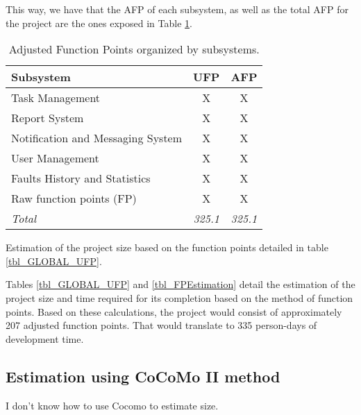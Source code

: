 This way, we have that the AFP of each subsystem, as well as the total AFP for the project are the ones exposed in Table \ref{tbl_GLOBAL_AFP}.

\begin{table}[hbtp]
\centering
\begin{tabular}{l|c|c}
\textbf{Subsystem} & \textbf{UFP} & \textbf{AFP} \\ \hline
Task Management  & X & X \\
Report System & X & X \\
Notification and Messaging System & X & X \\
User Management & X & X \\
Faults History and Statistics & X & X \\
Raw function points (FP) & X & X \\ \hline
\textit{Total} & \textit{325.1} & \textit{325.1}
\end{tabular}
\caption{Adjusted Function Points organized by subsystems.}
\label{tbl_GLOBAL_AFP}
\end{table}



\begin{table}[hbtp]
\centering

\caption{Estimation of the project size based on the function points detailed in table \ref{tbl_GLOBAL_UFP}.}
\label{tbl_FPEstimation}
\end{table}

Tables \ref{tbl_GLOBAL_UFP} and \ref{tbl_FPEstimation} detail the estimation of the project size and time required for its completion based on the method of function points. Based on these calculations, the project would consist of approximately 207 adjusted function points. That would translate to 335 person-days of development time.

\subsection{Estimation using CoCoMo II method}

I don't know how to use Cocomo to estimate size.

